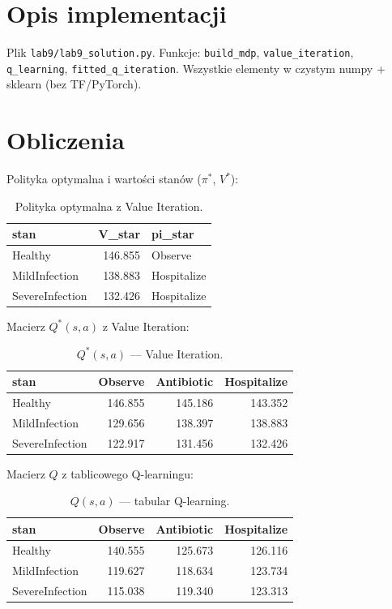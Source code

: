 \documentclass[12pt,a4paper]{article}
\begin{document}
\section{Opis implementacji}
Plik \texttt{lab9/lab9\_solution.py}. Funkcje: \texttt{build\_mdp}, \texttt{value\_iteration}, \texttt{q\_learning}, \texttt{fitted\_q\_iteration}. Wszystkie elementy w czystym numpy + sklearn (bez TF/PyTorch).

\section{Obliczenia}
Polityka optymalna i wartości stanów ($\pi^*$, $V^*$):

\begin{table}[H]
\centering
\begin{tabular}{lrl}
\toprule
stan & V\_star & pi\_star \\
\midrule
Healthy & 146.855 & Observe \\
MildInfection & 138.883 & Hospitalize \\
SevereInfection & 132.426 & Hospitalize \\
\bottomrule
\end{tabular}

\caption{Polityka optymalna z Value Iteration.}
\label{tab:vi}
\end{table}

Macierz $Q^*(s,a)$ z Value Iteration:

\begin{table}[H]
\centering
\begin{tabular}{lrrr}
\toprule
stan & Observe & Antibiotic & Hospitalize \\
\midrule
Healthy & 146.855 & 145.186 & 143.352 \\
MildInfection & 129.656 & 138.397 & 138.883 \\
SevereInfection & 122.917 & 131.456 & 132.426 \\
\bottomrule
\end{tabular}

\caption{$Q^*(s,a)$ --- Value Iteration.}
\label{tab:qstar}
\end{table}

Macierz $Q$ z tablicowego Q-learningu:

\begin{table}[H]
\centering
\begin{tabular}{lrrr}
\toprule
stan & Observe & Antibiotic & Hospitalize \\
\midrule
Healthy & 140.555 & 125.673 & 126.116 \\
MildInfection & 119.627 & 118.634 & 123.734 \\
SevereInfection & 115.038 & 119.340 & 123.313 \\
\bottomrule
\end{tabular}

\caption{$Q(s,a)$ --- tabular Q-learning.}
\label{tab:qq}
\end{table}
\end{document}
